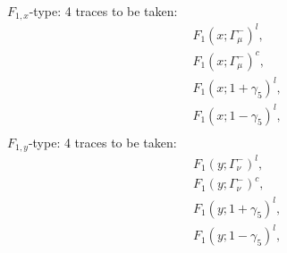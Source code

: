 $F_{1,x}$-type: 4 traces to be taken:
\begin{align*}
&F_1(x;\Gamma_\mu^-)^l,\\
&F_1(x;\Gamma_\mu^-)^c,\\
&F_1(x;1+\gamma_5)^l,\\
&F_1(x;1-\gamma_5)^l,\\
\end{align*}
$F_{1,y}$-type: 4 traces to be taken:
\begin{align*}
&F_1(y;\Gamma_\nu^-)^l,\\
&F_1(y;\Gamma_\nu^-)^c,\\
&F_1(y;1+\gamma_5)^l,\\
&F_1(y;1-\gamma_5)^l,\\
\end{align*}
